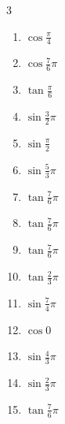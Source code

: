 \begin{multicols}{3}
\begin{enumerate}
  \item $\displaystyle \cos{\frac{\pi}{4}}$

  \item $\displaystyle \cos{\frac{7}{6}\pi}$

  \item $\displaystyle \tan{\frac{\pi}{6}}$

  \item $\displaystyle \sin{\frac{3}{2}\pi}$
        \phantom{$\displaystyle =-1$}

\columnbreak %

\resetques

  \item $\displaystyle \sin{\frac{\pi}{2}}$
        \phantom{$\displaystyle =1$}

  \item $\displaystyle \sin{\frac{5}{3}\pi}$

  \item $\displaystyle \tan{\frac{7}{6}\pi}$

  \item $\displaystyle \tan{\frac{7}{6}\pi}$

  \item $\displaystyle \tan{\frac{7}{6}\pi}$

  \item $\displaystyle \tan{\frac{2}{3}\pi}$

  \item $\displaystyle \sin{\frac{7}{4}\pi}$

  \item $\displaystyle \cos{0}$
        \phantom{$\displaystyle =1$}

  \item $\displaystyle \sin{\frac{4}{3}\pi}$

  \item $\displaystyle \sin{\frac{2}{3}\pi}$

  \item $\displaystyle \tan{\frac{7}{6}\pi}$


\end{enumerate}
\end{multicols}
